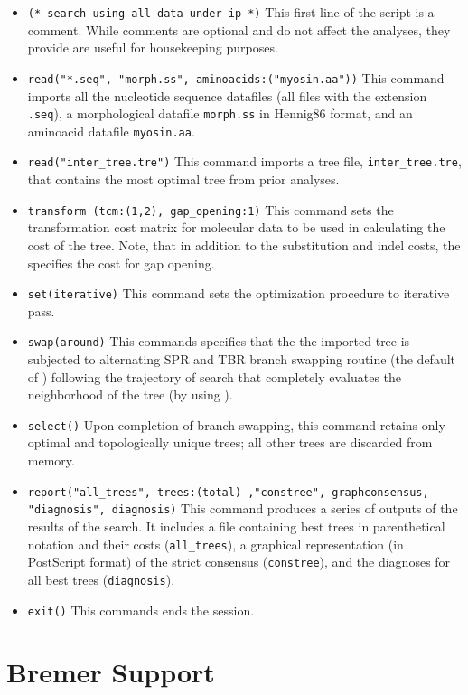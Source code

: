 \begin{itemize}
\item \texttt{(* search using all data under ip *)} This first line of the script is a comment. While comments are optional and do not affect the analyses, they provide are useful for housekeeping purposes.
\item \texttt{read("*.seq", "morph.ss", aminoacids:("myosin.aa"))} This command imports all the nucleotide sequence datafiles (all files with the extension \texttt{.seq}), a morphological datafile \texttt{morph.ss} in Hennig86 format, and an aminoacid datafile \texttt{myosin.aa}.
\item \texttt{read("inter\_tree.tre")} This command imports a tree file, \texttt{inter\_tree.tre}, that contains the most optimal tree from prior analyses. 
\item \texttt{transform (tcm:(1,2), gap\_opening:1)} This command sets the transformation cost matrix for molecular data to be used in calculating the cost of the tree. Note, that in addition to the substitution and indel costs, the  specifies the cost for gap opening.
\item \texttt{set(iterative)} This command sets the optimization procedure to iterative pass.
\item \texttt{swap(around)} This commands specifies that the the imported tree is subjected to alternating SPR and TBR branch swapping routine (the default of \poy) following the trajectory of search that completely evaluates the neighborhood of the tree (by using ).
\item \texttt{select()} Upon completion of branch swapping, this command retains only optimal and topologically unique trees; all other trees are discarded from memory.
\item \texttt{report("all\_trees", trees:(total) ,"constree", graphconsensus, "diagnosis", diagnosis)} This command produces a series of outputs of the results of the search. It includes a file containing best trees in parenthetical notation and their costs (\texttt{all\_trees}), a graphical representation (in PostScript format) of the strict consensus (\texttt{constree}), and the diagnoses for all best trees (\texttt{diagnosis}).
\item \texttt{exit()} This commands ends the \poy session.
\end{itemize}

\section{Bremer Support}{\label{tutorial 3}}


